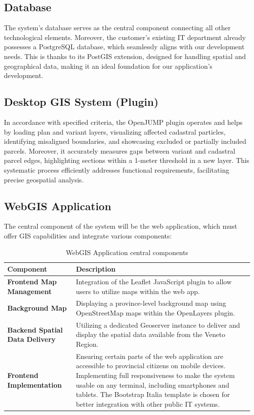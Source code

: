 \subsection{Database}\label{subsec:database}
The system's database serves as the central component connecting all other technological elements.
Moreover, the customer's existing IT department already possesses a PostgreSQL database, which seamlessly aligns with our development needs.
This is thanks to its PostGIS extension, designed for handling spatial and geographical data, making it an ideal foundation for our application's development.

\subsection{Desktop GIS System (Plugin)}\label{subsec:openjump-plugin}
In accordance with specified criteria, the OpenJUMP plugin operates and helps by loading plan and variant layers, visualizing affected cadastral particles, identifying misaligned boundaries, and showcasing excluded or partially included parcels.
Moreover, it accurately measures gaps between variant and cadastral parcel edges, highlighting sections within a 1-meter threshold in a new layer.
This systematic process efficiently addresses functional requirements, facilitating precise geospatial analysis.

\subsection{WebGIS Application}\label{subsec:webgis-application}
The central component of the system will be the web application, which must offer GIS capabilities and integrate various components:

\begin{table}[htbp]
    \centering
    \renewcommand{\arraystretch}{1.1}
    \begin{tabular}{|l|p{9cm}|}
        \hline
        \textbf{Component} & \textbf{Description} \\
        \hline
        \textbf{Frontend Map Management} & Integration of the Leaflet JavaScript plugin to allow users to utilize maps within the web app. \\
        \hline
        \textbf{Background Map} & Displaying a province-level background map using OpenStreetMap maps within the OpenLayers plugin. \\
        \hline
        \textbf{Backend Spatial Data Delivery} & Utilizing a dedicated Geoserver instance to deliver and display the spatial data available from the Veneto Region. \\
        \hline
        \textbf{Frontend Implementation} & Ensuring certain parts of the web application are accessible to provincial citizens on mobile devices. Implementing full responsiveness to make the system usable on any terminal, including smartphones and tablets. The Bootstrap Italia template is chosen for better integration with other public IT systems. \\
        \hline
    \end{tabular}
    \caption{WebGIS Application central components \label{tab:table-web-components}}
\end{table}

